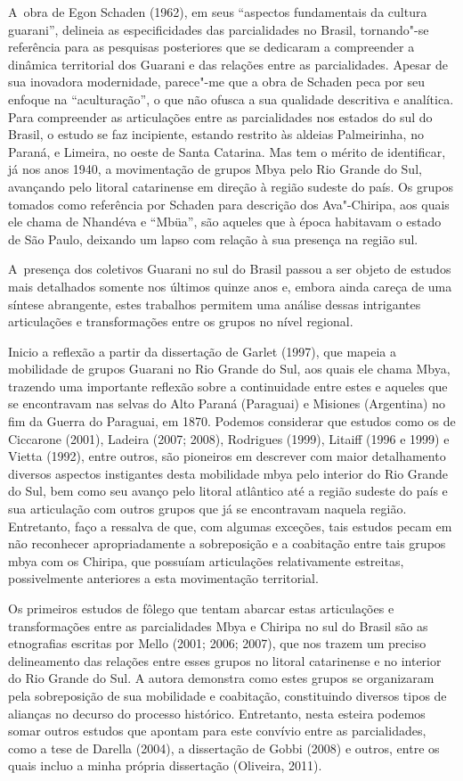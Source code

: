 A~obra de Egon Schaden (1962), em seus ``aspectos fundamentais
da cultura guarani'', delineia as especificidades das parcialidades no
Brasil, tornando"-se referência para as pesquisas posteriores que se
dedicaram a compreender a dinâmica territorial dos Guarani e das
relações entre as parcialidades. Apesar de sua inovadora modernidade,
parece"-me que a obra de Schaden peca por seu enfoque na ``aculturação'',
o que não ofusca a sua qualidade descritiva e analítica. Para compreender as articulações entre as
parcialidades nos estados do sul do Brasil, o estudo se faz incipiente,
estando restrito às aldeias Palmeirinha, no Paraná, e Limeira, no oeste
de Santa Catarina. Mas tem o mérito de identificar, já nos anos 1940, a
movimentação de grupos Mbya pelo Rio Grande do Sul, avançando pelo
litoral catarinense em direção à região sudeste do país. Os grupos
tomados como referência por Schaden para descrição dos Ava"-Chiripa, aos
quais ele chama de Nhandéva e ``Mbüa'', são aqueles que à época
habitavam o estado de São Paulo, deixando um lapso com relação à sua
presença na região sul.

A~presença dos coletivos Guarani no sul do Brasil passou a ser objeto de
estudos mais detalhados somente nos últimos quinze anos e, embora ainda
careça de uma síntese abrangente, estes trabalhos permitem uma análise
dessas intrigantes articulações e transformações entre os grupos no
nível regional. 

Inicio a reflexão a partir da dissertação de Garlet (1997), que
mapeia a mobilidade de grupos Guarani no Rio Grande do Sul, aos quais
ele chama Mbya, trazendo uma importante reflexão sobre a continuidade
entre estes e aqueles que se encontravam nas selvas do Alto Paraná
(Paraguai) e Misiones (Argentina) no fim da Guerra do Paraguai, em
1870. Podemos considerar que estudos como os de Ciccarone
(2001), Ladeira (2007; 2008), Rodrigues (1999),
Litaiff (1996 e 1999) e Vietta (1992), entre outros, são
pioneiros em descrever com maior detalhamento diversos aspectos
instigantes desta mobilidade mbya pelo interior do Rio Grande do Sul,
bem como seu avanço pelo litoral atlântico até a região sudeste do país
e sua articulação com outros grupos que já se encontravam naquela
região. Entretanto, faço a ressalva de que, com algumas exceções, tais
estudos pecam em não reconhecer apropriadamente a sobreposição e a
coabitação entre tais grupos mbya com os Chiripa, que possuíam
articulações relativamente estreitas, possivelmente anteriores a esta
movimentação territorial.

Os primeiros estudos de fôlego que tentam abarcar estas articulações e
transformações entre as parcialidades Mbya e Chiripa no sul do Brasil
são as etnografias escritas por Mello (2001; 2006;
2007), que nos trazem um preciso delineamento das relações entre esses
grupos no litoral catarinense e no interior do Rio Grande do Sul. A
autora demonstra como estes grupos se organizaram pela
sobreposição de sua mobilidade e coabitação, constituindo diversos
tipos de alianças no decurso do processo histórico. Entretanto, nesta
esteira podemos somar outros estudos que apontam para este convívio
entre as parcialidades, como a tese de Darella (2004), a
dissertação de Gobbi (2008) e outros, entre os quais incluo a
minha própria dissertação (Oliveira, 2011). 

